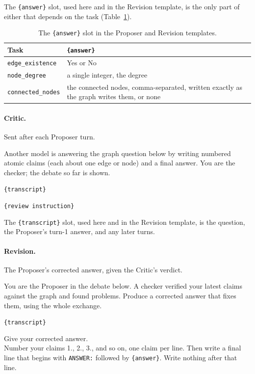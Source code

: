 \documentclass[11pt]{article}
\begin{document}
\noindent The \texttt{\{answer\}} slot, used here and in the Revision template, is the
only part of either that depends on the task (Table~\ref{tab:answerslot}).

\begin{table}[h]
  \centering
  \small
  \begin{tabular}{@{}l p{}@{}}
    \toprule
    \textbf{Task} & \textbf{\texttt{\{answer\}}} \\
    \midrule
    \texttt{edge\_existence}  & Yes or No \\
    \addlinespace
    \texttt{node\_degree}     & a single integer, the degree \\
    \addlinespace
    \texttt{connected\_nodes} & the connected nodes, comma-separated, written exactly
                                as the graph writes them, or none \\
    \bottomrule
  \end{tabular}
  \caption{The \texttt{\{answer\}} slot in the Proposer and Revision templates.}
  \label{tab:answerslot}
\end{table}

\paragraph{Critic.}
Sent after each Proposer turn.

\begin{promptblock}
Another model is answering the graph question below by writing numbered atomic claims
(each about one edge or node) and a final answer. You are the checker; the debate so
far is shown.

\texttt{\{transcript\}}

\texttt{\{review instruction\}}
\end{promptblock}

\noindent The \texttt{\{transcript\}} slot, used here and in the Revision template, is
the question, the Proposer's turn-1 answer, and any later turns.

\paragraph{Revision.}
The Proposer's corrected answer, given the Critic's verdict.

\begin{promptblock}
You are the Proposer in the debate below. A checker verified your latest claims against
the graph and found problems. Produce a corrected answer that fixes them, using the
whole exchange.

\texttt{\{transcript\}}

Give your corrected answer.\\
Number your claims 1., 2., 3., and so on, one claim per line. Then write a final line
that begins with \texttt{ANSWER:} followed by \texttt{\{answer\}}. Write nothing after
that line.
\end{promptblock}
\end{document}
